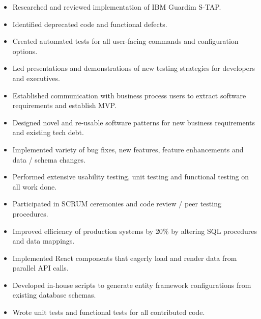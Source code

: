 \documentclass[10pt,a4paper,ragged2e,withhyper]{altacv}
\begin{document}
\medskip
\medskip
\medskip
\medskip
\medskip



\smallskip
{}

\begin{itemize}
\item Researched and reviewed implementation of IBM Guardim S-TAP.
\item Identified deprecated code and functional defects.
\item Created automated tests for all user-facing commands and configuration options.
\item Led presentations and demonstrations of new testing strategies for developers and executives.
\end{itemize}

\divider{}

\begin{itemize}
\item Established communication with business process users to extract software requirements and establish MVP.
\item Designed novel and re-usable software patterns for new business requirements and existing tech debt.
\item Implemented variety of bug fixes, new features, feature enhancements and data / schema changes.
\item Performed extensive usability testing, unit testing and functional testing on all work done.
\item Participated in SCRUM ceremonies and code review / peer testing procedures.
\end{itemize}

\divider{}

\begin{itemize}
\item Improved efficiency of production systems by 20\% by altering SQL procedures and data mappings.
\item Implemented React components that eagerly load and render data from parallel API calls.
\item Developed in-house scripts to generate entity framework configurations from existing database schemas.
\item Wrote unit tests and functional tests for all contributed code.
\end{itemize}
\end{document}
